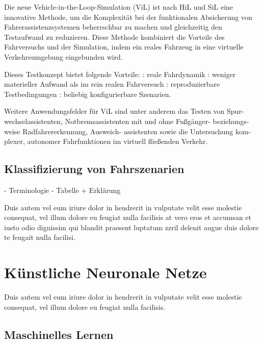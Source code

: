 Die neue Vehicle-in-the-Loop-Simulation (ViL) ist nach HiL und SiL eine innovative Methode, um die Komplexität bei der funktionalen Absicherung von Fahrerassistenzsystemen beherrschbar zu machen und gleichzeitig den Testaufwand zu reduzieren. Diese Methode kombiniert die Vorteile des Fahrversuchs und der Simulation, indem ein reales Fahrzeug in eine virtuelle Verkehrsumgebung eingebunden wird. \cite{schwab2014durchgangige}

Dieses Testkonzept bietet folgende Vorteile:
: reale Fahrdynamik
: weniger materieller Aufwand als im rein realen Fahrversuch
: reproduzierbare Testbedingungen
: beliebig konfigurierbare Szenarien. 

Weitere Anwendungsfelder für ViL sind unter anderem das Testen von Spur- wechselassistenten, Notbremsassistenten mit und ohne Fußgänger- beziehungs- weise Radfahrererkennung, Ausweich- assistenten sowie die Untersuchung kom- plexer, autonomer Fahrfunktionen im virtuell fließenden Verkehr. \cite{schwab2014durchgangige}




\subsection{Klassifizierung von Fahrszenarien}
\label{grundlagen_fahren_szenarien}

- Terminologie
- Tabelle + Erklärung

Duis autem vel eum iriure dolor in hendrerit in vulputate velit esse molestie consequat, vel illum dolore eu feugiat nulla facilisis at vero eros et accumsan et iusto odio dignissim qui blandit praesent luptatum zzril delenit augue duis dolore te feugait nulla facilisi.   


\section{Künstliche Neuronale Netze}
\label{grundlagen_nn}

Duis autem vel eum iriure dolor in hendrerit in vulputate velit esse molestie consequat, vel illum dolore eu feugiat nulla facilisis.


\subsection{Maschinelles Lernen}
\label{grundlagen_nn_ml}

